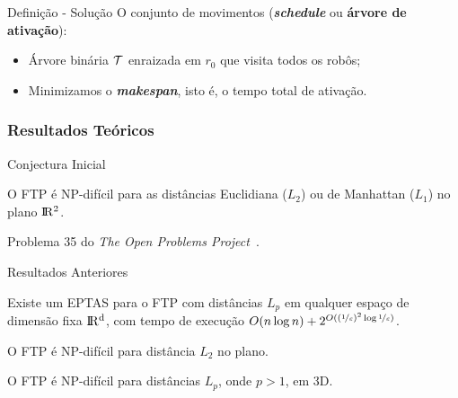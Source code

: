 \stopcounter
\begin{frame}{Definição - Solução}
  O conjunto de movimentos (\textbf{\emph{schedule}} ou \textbf{árvore de ativação}):

  \pause

  \begin{itemize}[<+->]
    \item Árvore binária $\mathcal{T}$ enraizada em $r_0$ que visita todos os robôs;

    \item Minimizamos o \textbf{\emph{makespan}}, isto é, o tempo total de ativação.
  \end{itemize}

  \pause
  \bigskip
  \begin{minipage}{\linewidth}
    \centering
  \end{minipage}
\end{frame}
\inccounter


\subsubsection{Resultados Teóricos}

\begin{frame}{Conjectura Inicial}
  \begin{conj}
    O FTP é NP-difícil para as distâncias Euclidiana ($L_2$) ou de Manhattan ($L_1$) no plano $\rm I\!R^2$.
  \end{conj}

  \pause
  Problema 35 do \emph{The Open Problems Project}~\cite{TOPP}.
\end{frame}

\begin{frame}{Resultados Anteriores}
  \begin{thm}
    Existe um EPTAS para o FTP com distâncias $L_p$ em qualquer espaço de dimensão fixa $\rm I\!R^d$, com tempo de execução $O(n \log n) + 2^{O((\nicefrac{1}{\varepsilon})^2\log{\nicefrac{1}{\varepsilon}})}$.
  \end{thm}

  \pause
  \begin{thm}
    O FTP é NP-difícil para distância $L_2$ no plano.
  \end{thm}

  \pause
  \begin{thm}
    O FTP é NP-difícil para distâncias $L_p$, onde $p>1$, em 3D.
  \end{thm}
\end{frame}

